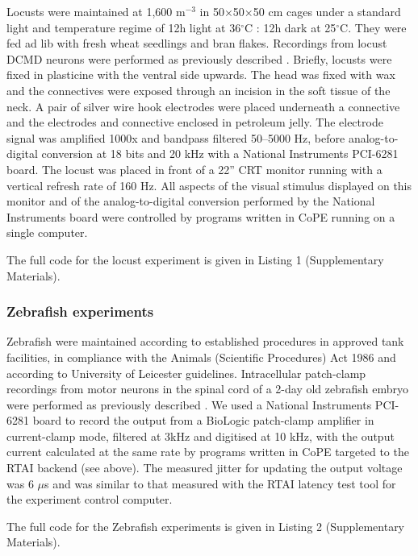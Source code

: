 Locusts were maintained at 1,600 m$^{-3}$ in 50$\times$50$\times$50 cm cages under a
standard light and temperature regime of 12h light at 36$^{\circ}$C : 12h dark
at 25$^{\circ}$C. They were fed ad lib with fresh wheat seedlings and bran
flakes. Recordings from locust DCMD neurons were performed as
previously described \citep{Matheson2004}. Briefly, locusts were fixed
in plasticine with the ventral side upwards. The head was fixed with
wax
and the connectives were exposed through an
incision in the soft tissue of the neck. A pair of silver wire hook
electrodes were placed underneath a connective and the electrodes
and connective enclosed in petroleum jelly. The electrode signal was
amplified 1000x and bandpass filtered 50--5000 Hz, before
analog-to-digital conversion at 18 bits and 20 kHz with a National
Instruments PCI-6281 board. The locust was placed in front of a 22''
CRT monitor running with a vertical refresh rate of 160 Hz. All
aspects of the visual stimulus displayed on this monitor and of
the analog-to-digital conversion performed by the National Instruments
board were controlled by programs written in
CoPE running on a single computer.

The full code for the locust experiment is given in Listing 1
(Supplementary Materials).

\subsubsection*{Zebrafish experiments}

Zebrafish were maintained according to established procedures
\citep{Westerfield1994} in approved tank facilities, in compliance
with the Animals (Scientific Procedures) Act 1986 and according to
University of Leicester guidelines. Intracellular patch-clamp
recordings from motor neurons in the spinal cord of a 2-day old
zebrafish embryo were performed as previously described
\citep{McDearmid2006}. We used a National Instruments PCI-6281 board
to record the output from a BioLogic patch-clamp amplifier in
current-clamp mode, filtered at 3kHz and digitised at 10 kHz, with the
output current calculated at the same rate by programs written in
CoPE targeted to the RTAI backend (see
above). The measured jitter for updating the output voltage was 6
$\mu$s and was similar to that measured with the RTAI latency test
tool for the experiment control computer.

The full code for the Zebrafish experiments is given in Listing 2
(Supplementary Materials).

